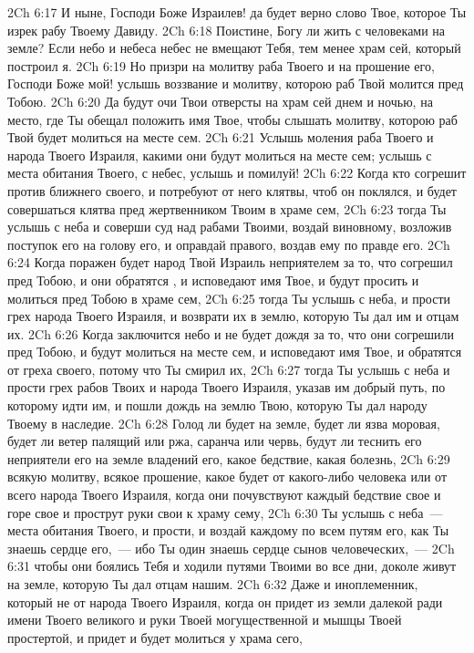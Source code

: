 \vs 2Ch 6:17 И ныне, Господи Боже Израилев! да будет верно слово Твое, которое Ты изрек рабу Твоему Давиду.
\vs 2Ch 6:18 Поистине, Богу ли жить с человеками на земле? Если небо и небеса небес не вмещают Тебя, тем менее храм сей, который построил я.
\vs 2Ch 6:19 Но призри на молитву раба Твоего и на прошение его, Господи Боже мой! услышь воззвание и молитву, которою раб Твой молится пред Тобою.
\vs 2Ch 6:20 Да будут очи Твои отверсты на храм сей днем и ночью, на место, где Ты обещал положить имя Твое, чтобы слышать молитву, которою раб Твой будет молиться на месте сем.
\vs 2Ch 6:21 Услышь моления раба Твоего и народа Твоего Израиля, какими они будут молиться на месте сем; услышь с места обитания Твоего, с небес, услышь и помилуй!
\vs 2Ch 6:22 Когда кто согрешит против ближнего своего, и потребуют от него клятвы, чтоб он поклялся, и будет совершаться клятва пред жертвенником Твоим в храме сем,
\vs 2Ch 6:23 тогда Ты услышь с неба и соверши суд над рабами Твоими, воздай виновному, возложив поступок его на голову его, и оправдай правого, воздав ему по правде его.
\vs 2Ch 6:24 Когда поражен будет народ Твой Израиль неприятелем за то, что согрешил пред Тобою, и они обратятся , и исповедают имя Твое, и будут просить и молиться пред Тобою в храме сем,
\vs 2Ch 6:25 тогда Ты услышь с неба, и прости грех народа Твоего Израиля, и возврати их в землю, которую Ты дал им и отцам их.
\vs 2Ch 6:26 Когда заключится небо и не будет дождя за то, что они согрешили пред Тобою, и будут молиться на месте сем, и исповедают имя Твое, и обратятся от греха своего, потому что Ты смирил их,
\vs 2Ch 6:27 тогда Ты услышь с неба и прости грех рабов Твоих и народа Твоего Израиля, указав им добрый путь, по которому идти им, и пошли дождь на землю Твою, которую Ты дал народу Твоему в наследие.
\vs 2Ch 6:28 Голод ли будет на земле, будет ли язва моровая, будет ли ветер палящий или ржа, саранча или червь, будут ли теснить его неприятели его на земле владений его,  какое бедствие, какая болезнь,
\vs 2Ch 6:29 всякую молитву, всякое прошение, какое будет от какого-либо человека или от всего народа Твоего Израиля, когда они почувствуют каждый бедствие свое и горе свое и прострут руки свои к храму сему,
\vs 2Ch 6:30 Ты услышь с неба~--- места обитания Твоего, и прости, и воздай каждому по всем путям его, как Ты знаешь сердце его,~--- ибо Ты один знаешь сердце сынов человеческих,~---
\vs 2Ch 6:31 чтобы они боялись Тебя и ходили путями Твоими во все дни, доколе живут на земле, которую Ты дал отцам нашим.
\vs 2Ch 6:32 Даже и иноплеменник, который не от народа Твоего Израиля, когда он придет из земли далекой ради имени Твоего великого и руки Твоей могущественной и мышцы Твоей простертой, и придет и будет молиться у храма сего,
